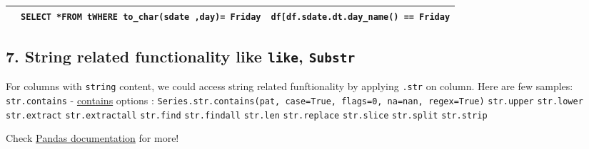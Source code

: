 \documentclass[11pt]{article}
\begin{document}
\begin{longtable}[]{@{}ccc@{}}
\begin{minipage}[t]{0.29\columnwidth}\centering
\strut
\end{minipage} & \begin{minipage}[t]{0.34\columnwidth}\centering
\texttt{SELECT\ *}\texttt{FROM\ t}\texttt{WHERE\ to\_char(sdate\ ,\textquotesingle{}day\textquotesingle{})=\ \textquotesingle{}Friday\textquotesingle{}}\strut
\end{minipage} & \begin{minipage}[t]{0.29\columnwidth}\centering
\texttt{df{[}df.sdate.dt.day\_name()\ ==\ \textquotesingle{}Friday\textquotesingle{}{]}}\strut
\end{minipage}\tabularnewline
\bottomrule
\end{longtable}

    \hypertarget{string-related-functionality-like-like-substr}{%
\subsection{\texorpdfstring{7. String related functionality like
\texttt{like},
\texttt{Substr}}{7. String related functionality like like, Substr}}\label{string-related-functionality-like-like-substr}}

    For columns with \texttt{string} content, we could access string related
funftionality by applying \texttt{.str} on column. Here are few samples:
\texttt{str.contains} -
\href{https://pandas.pydata.org/pandas-docs/stable/reference/api/pandas.Series.str.contains.html?}{contains}
options :
\texttt{Series.str.contains(pat,\ case=True,\ flags=0,\ na=nan,\ regex=True)}
\texttt{str.upper} \texttt{str.lower} \texttt{str.extract}
\texttt{str.extractall} \texttt{str.find} \texttt{str.findall}
\texttt{str.len} \texttt{str.replace} \texttt{str.slice}
\texttt{str.split} \texttt{str.strip}

Check
\href{https://pandas.pydata.org/pandas-docs/stable/search.html?q=.str.\&check_keywords=yes\&area=default}{Pandas
documentation} for more!
\end{document}
